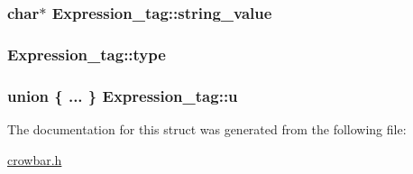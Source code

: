 \subsubsection[{string\+\_\+value}]{\setlength{\rightskip}{0pt plus 5cm}char$\ast$ Expression\+\_\+tag\+::string\+\_\+value}\label{struct_expression__tag_a850dde0947b60a3a0a0aaf1d1509bbe1}
\hypertarget{struct_expression__tag_a6e554d04874c28168b1294ad4860c2dc}{}
\subsubsection[{type}]{ Expression\+\_\+tag\+::type}\label{struct_expression__tag_a6e554d04874c28168b1294ad4860c2dc}
\hypertarget{struct_expression__tag_a0bb1fed3e5d9b4a6601d6783eb6bb9c3}{}
\subsubsection[{u}]{\setlength{\rightskip}{0pt plus 5cm}union \{ ... \}   Expression\+\_\+tag\+::u}\label{struct_expression__tag_a0bb1fed3e5d9b4a6601d6783eb6bb9c3}


The documentation for this struct was generated from the following file\+:\begin{DoxyCompactItemize}
\item 
\hyperlink{crowbar_8h}{crowbar.\+h}\end{DoxyCompactItemize}
